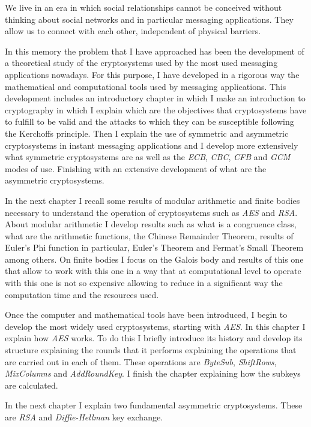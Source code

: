We live in an era in which social relationships cannot be conceived without thinking about social networks and in particular messaging applications. They allow us to connect with each other, independent of physical barriers.\par
In this memory the problem that I have approached has been the development of a theoretical study of the cryptosystems used by the most used messaging applications nowadays. For this purpose, I have developed in a rigorous way the mathematical and computational tools used by messaging applications. This development includes an introductory chapter in which I make an introduction to cryptography in which I explain which are the objectives that cryptosystems have to fulfill to be valid and the attacks to which they can be susceptible following the Kerchoffs principle. Then I explain the use of symmetric and asymmetric cryptosystems in instant messaging applications and I develop more extensively what symmetric cryptosystems are as well as the \emph{ECB}, \emph{CBC}, \emph{CFB} and \emph{GCM} modes of use. Finishing with an extensive development of what are the asymmetric cryptosystems.\par
In the next chapter I recall some results of modular arithmetic and finite bodies necessary to understand the operation of cryptosystems such as \emph{AES} and \emph{RSA}. About modular arithmetic I develop results such as what is a congruence class, what are the arithmetic functions, the Chinese Remainder Theorem, results of Euler's Phi function in particular, Euler's Theorem and Fermat's Small Theorem among others.
On finite bodies I focus on the Galois body and results of this one that allow to work with this one in a way that at computational level to operate with this one is not so expensive allowing to reduce in a significant way the computation time and the resources used.\par
Once the computer and mathematical tools have been introduced, I begin to develop the most widely used cryptosystems, starting with \emph{AES}.
In this chapter I explain how \emph{AES} works. To do this I briefly introduce its history and develop its structure explaining the rounds that it performs explaining the operations that are carried out in each of them. These operations are \emph{ByteSub}, \emph{ShiftRows}, \emph{MixColumns} and \emph{AddRoundKey}. I finish the chapter explaining how the subkeys are calculated. \par
In the next chapter I explain two fundamental asymmetric cryptosystems. These are \emph{RSA} and \emph{Diffie-Hellman} key exchange.
